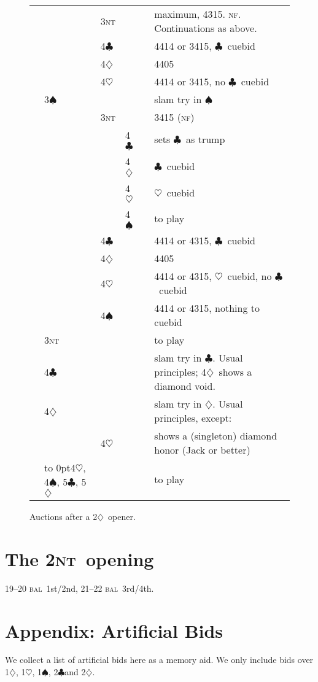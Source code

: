 \documentclass{report}
\newcommand{\fs}{1st/2nd}
\newcommand{\tf}{3rd/4th}
\newcommand{\bal}{\textsc{bal}}
\newcommand{\nf}{\textsc{nf}}
\renewcommand{\c}{\ensuremath{\clubsuit}}
\renewcommand{\d}{\ensuremath{\diamondsuit}}
\newcommand{\h}{\ensuremath{\heartsuit}}
\newcommand{\s}{\ensuremath{\spadesuit}}
\newcommand{\nt}{\textsc{nt}}
\newcommand{\+}{\ensuremath{^+}}
\begin{document}
\begin{figure}[ht]
\begin{tabular}{llllll}
&    &3\nt&&&maximum, 4315.  \nf.  Continuations as above.\\
&    &4\c &&&4414 or 3415, \c\ cuebid\\
&    &4\d &&&4405\\
&    &4\h &&&4414 or 3415, no \c\ cuebid\\
&3\s &&&&slam try in \s\\
&    &3\nt&&&3415 (\nf)\\
&    &    &4\c &&sets \c\ as trump\\
&    &    &4\d &&\c\ cuebid\\
&    &    &4\h &&\h\ cuebid\\
&    &    &4\s &&to play\\
&    &4\c &&&4414 or 4315, \c\ cuebid\\
&    &4\d &&&4405\\
&    &4\h &&&4414 or 4315, \h\ cuebid, no \c\ cuebid\\
&    &4\s &&&4414 or 4315, nothing to cuebid\\
&3\nt&&&&to play\\
&4\c &&&&slam try in \c.  Usual principles; 4\d\ shows a diamond void.\\
&4\d &&&&slam try in \d.  Usual principles, except:\\
&    &4\h &&&shows a (singleton) diamond honor (Jack or better)\\
&\hbox to 0pt{4\h, 4\s, 5\c, 5\d\hss}&&&&to play
\end{tabular}
\caption{Auctions after a 2\d\ opener.}
\end{figure}

\chapter{The 2\nt\ opening}

19--20 \bal\ \fs, 21--22 \bal\ \tf.

\chapter{Appendix: Artificial Bids}
We collect a list of artificial bids here as a memory aid.  We only include bids over 1\d, 1\h, 1\s, 2\c and 2\d.
\end{document}
